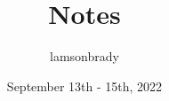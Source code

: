 \usepackage[utf8]{inputenc}

\title{Notes}
\author{lamsonbrady }
\date{September 13th - 15th, 2022}

\usepackage{parskip}

\usepackage{fancyhdr}
\pagestyle{fancy}

\usepackage{amsmath}
\usepackage{amssymb}

\usepackage{graphicx}

\newcommand{\psmall}[1]{
\left(\begin{smallmatrix}
#1
\end{smallmatrix} \right)
}

\newcommand{\genericmat}[2]{
	\ensuremath{
		\begin{#1matrix}
			#2
		\end{#1matrix}
	}
}

\newcommand{\bb}{\mathbb}
\newcommand{\R}{\mathbb{R}}
\renewcommand{\P}{\mathbb{P}}
\newcommand{\Z}{\mathbb{Z}}

\newcommand{\genericvec}[1]{
	\ensuremath{
		\left\{\vec{#1_1}, \vec{#1_2}, \dots, \vec{#1_n} \right\}
	}
}

